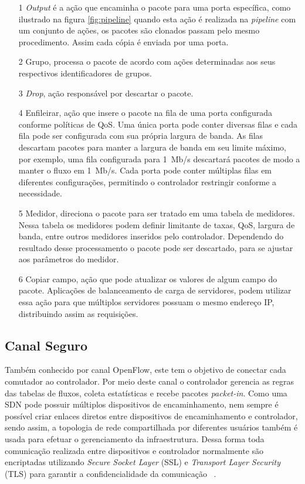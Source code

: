 \begin{itemize}
\item[1] \emph{ Output} é a ação que encaminha o pacote para uma porta específica, como ilustrado na figura \ref{fig:pipeline} quando esta ação é realizada na \textit{pipeline}  com um conjunto de ações, os pacotes são clonados passam pelo mesmo procedimento. Assim cada cópia é enviada por uma porta.
\item[2] Grupo, processa o pacote de acordo com ações determinadas aos seus respectivos identificadores de grupos.
\item[3] \emph{Drop}, ação responsável por descartar o pacote. 
\item[4] Enfileirar, ação que insere o pacote na fila de uma porta configurada conforme políticas de QoS. Uma única porta pode conter diversas filas e cada fila pode ser configurada com sua própria largura de banda. As filas descartam pacotes para manter a largura de banda em seu limite máximo, por exemplo, uma fila configurada para 1~Mb/s descartará pacotes de modo a manter o fluxo em 1~Mb/s. Cada porta pode conter múltiplas filas em diferentes configurações, permitindo o controlador restringir conforme a necessidade.
\item[5] Medidor, direciona o pacote para ser tratado em uma tabela de medidores. Nessa tabela os medidores podem definir limitante de taxas, QoS, largura de banda, entre outros medidores inseridos pelo controlador. Dependendo do resultado desse processamento o pacote pode ser descartado, para se ajustar aos parâmetros do medidor.
\item[6] Copiar campo, ação que pode atualizar os valores de algum campo do pacote. Aplicações de balanceamento de carga de servidores, podem utilizar essa ação para que múltiplos servidores possuam o mesmo endereço IP, distribuindo assim as requisições.
\end{itemize}





\subsection{Canal Seguro}
\label{sub:canal}
Também conhecido por canal OpenFlow, este tem o objetivo de conectar cada comutador ao controlador. Por meio deste canal o controlador gerencia as regras das tabelas de fluxos, coleta estatísticas e recebe pacotes \textit{packet-in}. Como uma SDN pode possuir múltiplos dispositivos de encaminhamento, nem sempre é possível criar enlaces diretos entre dispositivos de encaminhamento e controlador, sendo assim, a topologia de rede compartilhada por diferentes usuários também é usada para efetuar o gerenciamento da infraestrutura. Dessa forma toda comunicação realizada entre dispositivos e controlador normalmente são encriptadas utilizando \textit{Secure Socket Layer} (SSL) e \textit{Transport Layer Security} (TLS) para garantir a confidencialidade da comunicação ~\cite{pfaff2012openflow}. 
